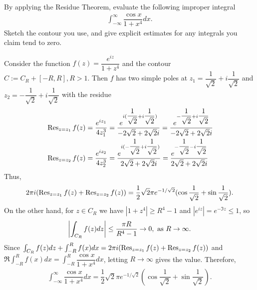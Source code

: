 \begin{problem}
By applying the Residue Theorem, evaluate the following improper
integral
\begin{align*}
    \int_{-\infty}^\infty\dfrac{\cos x}{1+x^4}dx.
\end{align*}
Sketch the contour you use, and give explicit estimates for any integrals you
claim tend to zero.
\begin{solution}
Consider the function $f(z)=\dfrac{e^{iz}}{1+z^4}$ and the contour $C:=C_R+[-R,R],R>1.$
Then $f$ has two simple poles at $z_1=\dfrac{1}{\sqrt{2}}+i\dfrac{1}{\sqrt{2}}$ and $z_2=-\dfrac{1}{\sqrt{2}}+i\dfrac{1}{\sqrt{2}}$ with the residue
\begin{align*}
    &\operatorname{Res}_{z=z_1} f(z)=\dfrac{e^{iz_1}}{4z_1^3}=\dfrac{e^{i(\dfrac{1}{\sqrt{2}}+i\dfrac{1}{\sqrt{2}})}}{-2\sqrt{2}+2\sqrt{2}i}=\dfrac{e^{-\dfrac{1}{\sqrt{2}}+i\dfrac{1}{\sqrt{2}}}}{-2\sqrt{2}+2\sqrt{2}i}\\
    & \operatorname{Res}_{z=z_2}f(z)=\dfrac{e^{iz_2}}{4z_2^3}=\dfrac{e^{i(-\dfrac{1}{\sqrt{2}}+i\dfrac{1}{\sqrt{2}})}}{2\sqrt{2}+2\sqrt{2}i}=\dfrac{e^{-\dfrac{1}{\sqrt{2}}-i\dfrac{1}{\sqrt{2}}}}{2\sqrt{2}+2\sqrt{2}i}
\end{align*}
Thus, \begin{align*}
    2\pi i(\operatorname{Res}_{z=z_1}f(z)+\operatorname{Res}_{z=z_2}f(z))=\dfrac{1}{2}\sqrt{2}\pi e^{-1/\sqrt{2}}(\cos\dfrac{1}{\sqrt{2}}+\sin\dfrac{1}{\sqrt{2}}).
\end{align*}
On the other hand, for $z\in C_R$ we have $|1+z^4|\ge R^4-1$ and $|e^{iz}|=e^{-\Im z}\le 1$, so
\begin{align*}
    \left\lvert \int_{C_R}f(z)dz\right\rvert\le \dfrac{\pi R}{R^4-1}\rightarrow 0,\text{ as }R\rightarrow\infty.
\end{align*}
Since $\int_{C_R}f(z)dz+\int_{-R}^R f(x)dx=2\pi i(\operatorname{Res}_{z=z_1}f(z)+\operatorname{Res}_{z=z_2}f(z))$ and $\Re\int_{-R}^R f(x)dx=\int_{-R}^R\dfrac{\cos x}{1+x^4}dx$, letting $R\rightarrow\infty$ gives the value. Therefore,
\begin{align*}
    \int_{-\infty}^\infty\dfrac{\cos x}{1+x^4}dx=\dfrac{1}{2}\sqrt{2}\pi e^{-1/\sqrt{2}}(\cos\dfrac{1}{\sqrt{2}}+\sin\dfrac{1}{\sqrt{2}}).
\end{align*}
\end{solution}
\end{problem}

